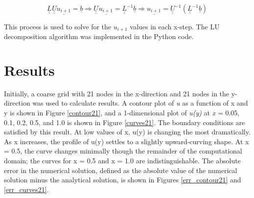 \documentclass[10pt]{article}
\begin{document}
\begin{equation}
\underline{\underline{L}}^{ } \underline{\underline{U}} \underline{u_{i+1}} = \underline{b} \Rightarrow \underline{\underline{U}}^{ } \underline{u_{i+1}} = \underline{\underline{L}}^{-1}\underline{b} \Rightarrow \underline{u_{i+1}} = \underline{\underline{U}}^{-1}(\underline{\underline{L}}^{-1}\underline{b})
\end{equation}

This process is used to solve for the \textit{$u_{i+1}$} values in each x-step. The LU decomposition algorithm was implemented in the Python code.

\vspace{-5pt}
\section*{Results}
\vspace{-8pt}
Initially, a coarse grid with 21 nodes in the x-direction and 21 nodes in the y-direction was used to calculate results. A contour plot of \textit{u} as a function of x and y is shown in Figure \ref{contour21}, and a 1-dimensional plot of \textit{u(y)} at \textit{x} = 0.05, 0.1, 0.2, 0.5, and 1.0 is shown in Figure \ref{curves21}. The boundary conditions are satisfied by this result. At low values of x, u(y) is changing the most dramatically. As x increases, the profile of u(y) settles to a slightly upward-curving shape. At x = 0.5, the curve changes minimally though the remainder of the computational domain; the curves for x = 0.5 and x = 1.0 are indistinguishable. The absolute error in the numerical solution, defined as the absolute value of the numerical solution minus the analytical solution, is shown in Figures \ref{err_contour21} and \ref{err_curves21}.
\end{document}
